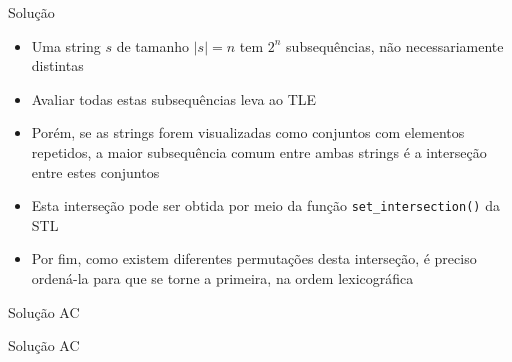 \begin{frame}[fragile]{Solução}

    \begin{itemize}
        \item Uma string $s$ de tamanho $|s| = n$ tem $2^n$ subsequências, não necessariamente
            distintas

        \item Avaliar todas estas subsequências leva ao TLE

        \item Porém, se as strings forem visualizadas como conjuntos com elementos repetidos,
            a maior subsequência comum entre ambas strings é a interseção entre estes conjuntos

        \item Esta interseção pode ser obtida por meio da função \texttt{set\_intersection()} da STL

        \item Por fim, como existem diferentes permutações desta interseção, é preciso ordená-la
            para que se torne a primeira, na ordem lexicográfica
   \end{itemize}

\end{frame}

\begin{frame}[fragile]{Solução AC}
\end{frame}

\begin{frame}[fragile]{Solução AC}
\end{frame}
